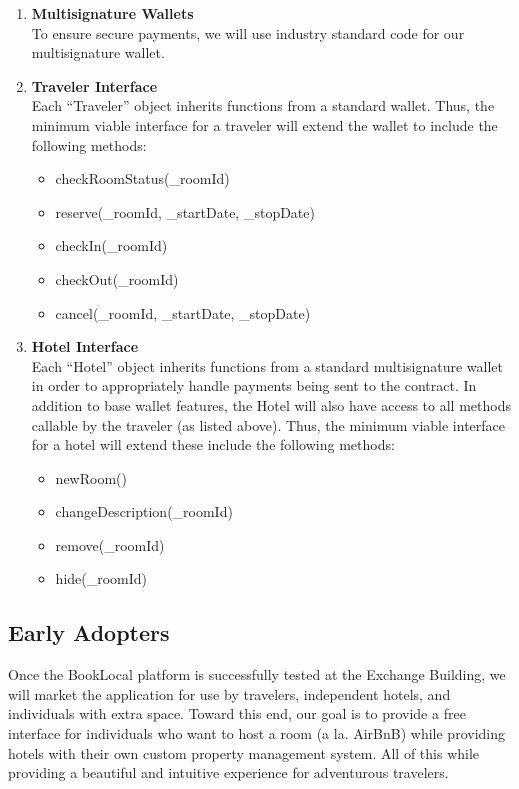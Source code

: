\documentclass{article}
\begin{document}
\begin{enumerate}
\item{\textbf{Multisignature Wallets}} \\
To ensure secure payments, we will use industry standard code for our multisignature wallet. 

\item{\textbf{Traveler Interface}} \\
Each ``Traveler'' object inherits functions from a standard wallet. Thus, the minimum viable interface for a traveler will extend the wallet to include the following methods: 
 \begin{itemize}
  \item checkRoomStatus(\_roomId)
  \item reserve(\_roomId, \_startDate, \_stopDate)
  \item checkIn(\_roomId)
  \item checkOut(\_roomId)
  \item cancel(\_roomId, \_startDate, \_stopDate)
 \end{itemize}
 
\item{\textbf{Hotel Interface}} \\
Each ``Hotel'' object inherits functions from a standard multisignature wallet in order to appropriately handle payments being sent to the contract. In addition to base wallet features, the Hotel will also have access to all methods callable by the traveler (as listed above). Thus, the minimum viable interface for a hotel will extend these include the following methods: 
 \begin{itemize}
  \item newRoom()
  \item changeDescription(\_roomId) 
  \item remove(\_roomId)
  \item hide(\_roomId)
 \end{itemize}
 
\end{enumerate}

\subsection{Early Adopters}
Once the BookLocal platform is successfully tested at the Exchange Building, we will market the application for use by travelers, independent hotels, and individuals with extra space. Toward this end, our goal is to provide a free interface for individuals who want to host a room (a la. AirBnB) while providing hotels with their own custom property management system. All of this while providing a beautiful and intuitive experience for adventurous travelers.
\end{document}
